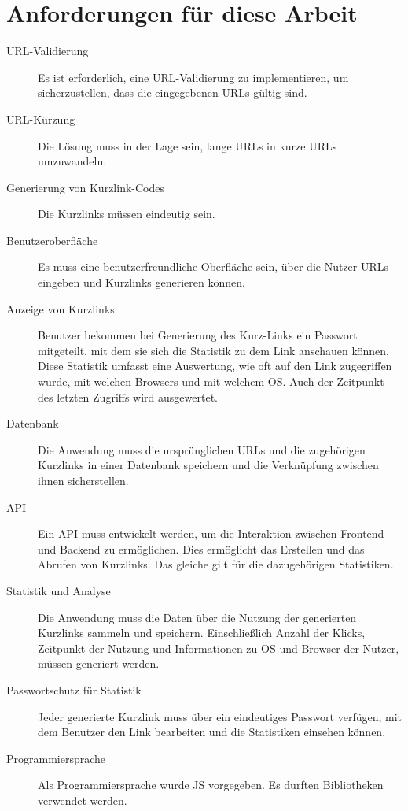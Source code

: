 \documentclass[a4paper,11pt,DIV=12]{scrreprt}%
\begin{document}
\section{Anforderungen für diese Arbeit}
\begin{description}
    \item[URL-Validierung] Es ist erforderlich, eine \ac{URL}-Validierung zu implementieren, um sicherzustellen, dass die eingegebenen \ac{URL}s gültig sind.
    \item[URL-Kürzung] Die Lösung muss in der Lage sein, lange \ac{URL}s in kurze \ac{URL}s umzuwandeln.
    \item[Generierung von Kurzlink-Codes] Die Kurzlinks müssen eindeutig sein.
    \item[Benutzeroberfläche] Es muss eine benutzerfreundliche Oberfläche sein, über die Nutzer \ac{URL}s eingeben und Kurzlinks generieren können.
    \item[Anzeige von Kurzlinks] Benutzer bekommen bei Generierung des Kurz-Links ein Passwort mitgeteilt, mit dem sie sich die Statistik zu dem Link anschauen können. Diese Statistik umfasst eine Auswertung, wie oft auf den Link zugegriffen wurde, mit welchen Browsers und mit welchem \ac{OS}. Auch der Zeitpunkt des letzten Zugriffs wird ausgewertet.
    \item[Datenbank] Die Anwendung muss die ursprünglichen \ac{URL}s und die zugehörigen Kurzlinks in einer Datenbank speichern und die Verknüpfung zwischen ihnen sicherstellen.
    \item[API] Ein \ac{API} muss entwickelt werden, um die Interaktion zwischen Frontend und Backend zu ermöglichen. Dies ermöglicht das Erstellen und das Abrufen von Kurzlinks. Das gleiche gilt für die dazugehörigen Statistiken.
    \item[Statistik und Analyse] Die Anwendung muss die Daten über die Nutzung der generierten Kurzlinks sammeln und speichern. Einschließlich Anzahl der Klicks, Zeitpunkt der Nutzung und Informationen zu \ac{OS} und Browser der Nutzer, müssen generiert werden.
    \item[Passwortschutz für Statistik] Jeder generierte Kurzlink muss über ein eindeutiges Passwort verfügen, mit dem Benutzer den Link bearbeiten und die Statistiken einsehen können.
    \item[Programmiersprache] Als Programmiersprache wurde \ac{JS} vorgegeben. Es durften Bibliotheken verwendet werden.
\end{description}

\end{document}
